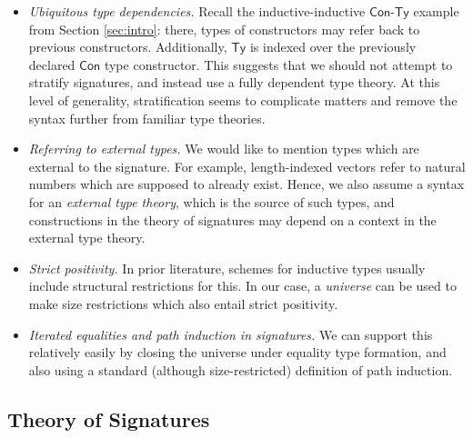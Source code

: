 \documentclass[dvipsnames]{lmcs} %
\newcommand{\Con}{\mathsf{Con}}
\newcommand{\Ty}{\mathsf{Ty}}
\newcommand{\1}{\mathsf{1}} \renewcommand{\Pr}{\mathsf{Pr}}
\theoremstyle{plain}\newtheorem{satz}[thm]{Satz} %
\begin{document}
\begin{itemize}
\item\emph{Ubiquitous type dependencies.}
Recall the inductive-inductive $\Con$-$\Ty$ example from Section
\ref{sec:intro}: there, types of constructors may refer back to previous
constructors. Additionally, $\Ty$ is indexed over the previously declared $\Con$
type constructor. This suggests that we should not attempt to stratify
signatures, and instead use a fully dependent type theory. At this level of
generality, stratification seems to complicate matters and remove the syntax
further from familiar type theories.

\item\emph{Referring to external types.}
We would like to mention types which are external to the signature. For example,
length-indexed vectors refer to natural numbers which are supposed to already
exist. Hence, we also assume a syntax for an \emph{external type theory}, which
is the source of such types, and constructions in the theory of signatures may
depend on a context in the external type theory.

\item\emph{Strict positivity.}
In prior literature, schemes for inductive types usually include structural
restrictions for this. In our case, a \emph{universe} can be used to make
size restrictions which also entail strict positivity.

\item\emph{Iterated equalities and path induction in signatures.}
We can support this relatively easily by closing the universe under equality
type formation, and also using a standard (although size-restricted) definition
of path induction.
\end{itemize}


\subsection{Theory of Signatures}
\label{sec:tos}
\end{document}
